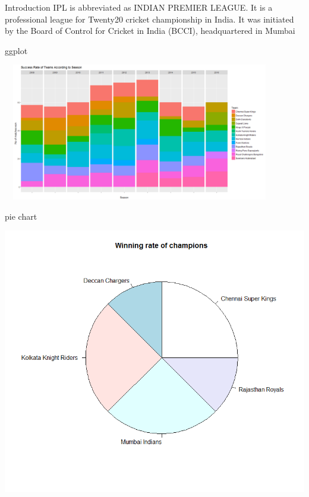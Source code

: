 \documentclass[14pt]{beamer}
\begin{document}
\begin{frame}{Introduction}
      IPL is abbreviated as INDIAN PREMIER LEAGUE.
      It is a professional league for Twenty20 cricket championship in India. 
      It was initiated by the Board of Control for Cricket in India (BCCI), headquartered in Mumbai
      
\end{frame}
\begin{frame}{ggplot}
  \begin{center}
    \includegraphics[width=12cm,height=6cm]{plotfinal.png}
  \end{center}
\end{frame}
\begin{frame}{pie chart}
  \begin{center}
    \includegraphics[scale=0.350]{Rplot24.png}
  \end{center}
\end{frame}
\end{document}
